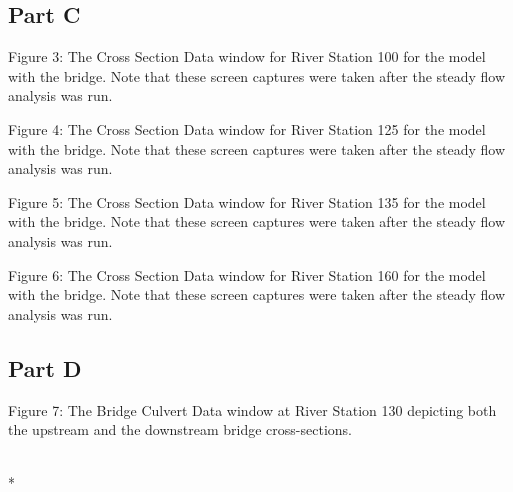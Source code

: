 \documentclass[]{article}
\begin{document}
\subsection{Part C}
\begin{minipage}[t]{\linewidth}
	\raggedright
	
	\medskip
	\begin{center} 
		Figure 3: The Cross Section Data window for River Station 100 for the model with the bridge. Note that these screen captures were taken after the steady flow analysis was run. 
	\end{center}
	\bigskip
	\medskip
	\begin{center} 
		Figure 4: The Cross Section Data window for River Station 125 for the model with the bridge. Note that these screen captures were taken after the steady flow analysis was run. 
	\end{center}
\end{minipage}
\begin{minipage}[t]{\linewidth}
	\raggedright
	
	\medskip
	\begin{center} 
		Figure 5: The Cross Section Data window for River Station 135 for the model with the bridge. Note that these screen captures were taken after the steady flow analysis was run. 
	\end{center}
	\bigskip
{}
\medskip
\begin{center} 
	Figure 6: The Cross Section Data window for River Station 160 for the model with the bridge. Note that these screen captures were taken after the steady flow analysis was run. 
\end{center}
\end{minipage}
\newpage

\subsection{Part D}
 \begin{minipage}[t]{\linewidth}
	\raggedright
	
	\medskip
	\begin{center} 
		Figure 7: The Bridge Culvert Data window at River Station 130 depicting both the upstream and the downstream bridge cross-sections.
	\end{center}
\end{minipage}\\* 
\end{document}

